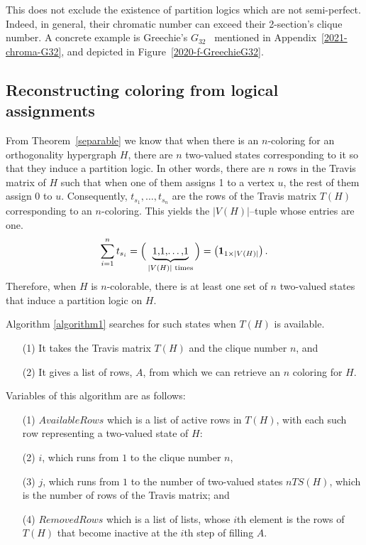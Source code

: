 \documentclass[%
12pt,
prereprint,
showpacs,
showkeys,
preprintnumbers,
amsmath,amssymb,
aps,
pra,
longbibliography,
notitlepage
]{revtex4-1}
\theoremstyle{definition}
\begin{document}
	This does not exclude the existence of partition logics which are not semi-perfect.
	Indeed, in general, their chromatic number can exceed their 2-section's clique number.
	A concrete example is
	Greechie's $G_{32}$~\cite[Figure~6, p.~121]{greechie:71} mentioned in Appendix~\ref{2021-chroma-G32}, and depicted in
	Figure~\ref{2020-f-GreechieG32}.
	
	
	\subsection{Reconstructing coloring from logical assignments}
	
	From Theorem~\ref{separable} we know that when there is an $n$-coloring for an orthogonality hypergraph $H$, there are $n$ two-valued states corresponding to it so that they induce a partition logic. In other words, there are $n$ rows in the Travis matrix of $H$ such that when one of them assigns 1 to a vertex $u$, the rest of them assign 0 to $u$. Consequently, $t_{s_1},\ldots,t_{s_n}$ are the rows of the Travis matrix $T(H)$ corresponding to an $n$-coloring. This yields the $\vert V(H)\vert$--tuple whose entries are one.
	\begin{equation}\label{color-all-two-states}
		\sum_{i=1}^{n} t_{s_i} = \Big(\underbrace{\raisebox{-0pt}{1,1,\ldots,1}}_{\vert V(H)\vert \text{ times}}\Big)=\begin{pmatrix}\mathbf{1}_{1\times \vert V(H)\vert}\end{pmatrix}.
	\end{equation}
	Therefore, when $H$ is $n$-colorable, there is at least one set of $n$ two-valued states that induce a partition logic on $H$.
	
	Algorithm \ref{algorithm1} searches for such states when $T(H)$ is available.
	\begin{enumerate}
		\item[(1)] It takes the Travis matrix $T(H)$ and the clique number $n$, and
		\item[(2)] It gives a list of rows, $A$, from which we can retrieve an $n$ coloring for $H$.
	\end{enumerate}
	
	Variables of this algorithm are as follows:
	\begin{enumerate}
		\item[(1)] $AvailableRows$ which is a list of active rows in $T(H)$, with each such row representing a two-valued state of $H$:
		\item[(2)] $i$, which runs from $1$ to the clique number $n$,
		\item[(3)] $j$, which runs from $1$ to the number of two-valued states $nTS(H)$, which is the number of rows of the Travis matrix; and
		\item[(4)] $RemovedRows$ which is a list of lists, whose $i$th element is the rows of $T(H)$ that become inactive at the $i$th step of filling $A$.
	\end{enumerate}
	
\end{document}
